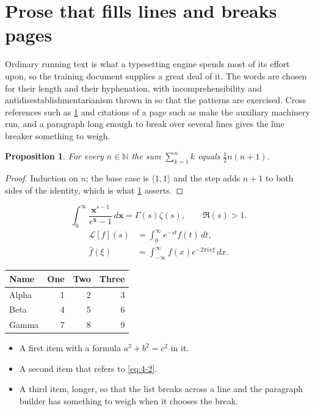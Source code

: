 \documentclass[11pt,a4paper]{report}
\theoremstyle{plain}
\newtheorem{proposition}{Proposition}[chapter]
\newcommand{\vecn}[1]{\mathbf{#1}}
\newcommand{\pairs}[2]{\langle #1,#2\rangle}
\begin{document}
\section{Prose that fills lines and breaks pages}
\label{sec:prose4-2}
Ordinary running text is what a typesetting engine spends most of its effort
upon, so the training document supplies a great deal of it. The words are
chosen for their length and their hyphenation, with incomprehensibility and
antidisestablishmentarianism thrown in so that the patterns are exercised.
Cross references such as \cref{sec:prose4-2} and citations of a page such
as \pageref{sec:prose4-2} make the auxiliary machinery run, and a
paragraph long enough to break over several lines gives the line breaker
something to weigh.
\begin{proposition}\label{prop:4-2}
For every $n\in\mathbb{N}$ the sum $\sum_{k=1}^{n}k$ equals
$\tfrac{1}{2}n(n+1)$.
\end{proposition}
\begin{proof}
Induction on $n$; the base case is $\pairs{1}{1}$ and the step adds $n+1$ to
both sides of the identity, which is what \cref{prop:4-2} asserts.
\end{proof}
\begin{equation}\label{eq:4-2}
  \int_{0}^{\infty}\frac{\vecn{x}^{s-1}}{e^{\vecn{x}}-1}\,d\vecn{x}
    = \Gamma(s)\zeta(s),\qquad \Re(s)>1 .
\end{equation}
\begin{align}
  \mathcal{L}[f](s) &= \int_{0}^{\infty} e^{-st} f(t)\,dt, \\
  \widehat{f}(\xi)  &= \int_{-\infty}^{\infty} f(x) e^{-2\pi i x\xi}\,dx .
\end{align}
\par\noindent\begin{center}
\begin{tabular}{lrrr}
\hline
Name & One & Two & Three \\
\hline
Alpha & 1 & 2 & 3 \\
Beta & 4 & 5 & 6 \\
Gamma & 7 & 8 & 9 \\
\hline
\end{tabular}
\end{center}
\begin{itemize}
  \item A first item with a formula $a^2+b^2=c^2$ in it.
  \item A second item that refers to \eqref{eq:4-2}.
  \item A third item, longer, so that the list breaks across a line and the
    paragraph builder has something to weigh when it chooses the break.
\end{itemize}
\end{document}
